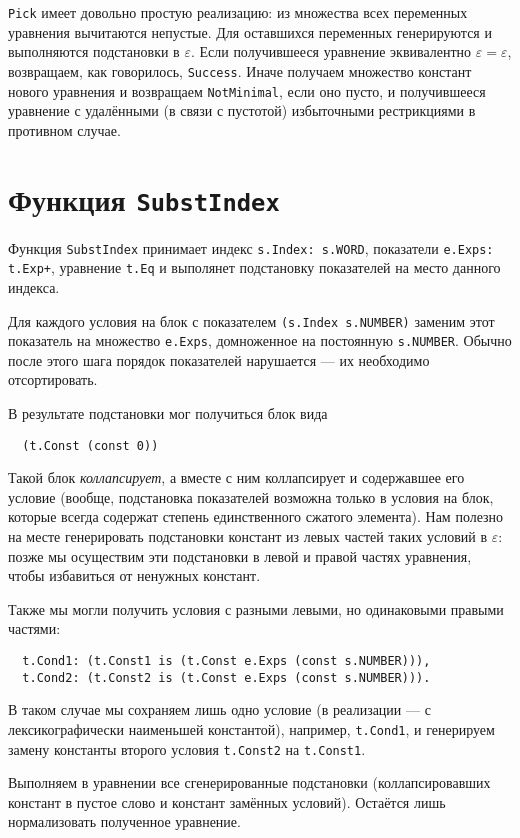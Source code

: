 \documentclass[12pt]{article}
\begin{document}
\texttt{Pick} имеет довольно простую реализацию: из множества всех переменных
уравнения вычитаются непустые. Для оставшихся переменных генерируются
и выполняются подстановки в $\varepsilon$. Если получившееся уравнение
эквивалентно $\varepsilon = \varepsilon$, возвращаем, как говорилось,
\texttt{Success}. Иначе получаем множество констант нового уравнения и
возвращаем \texttt{NotMinimal}, если оно пусто, и получившееся уравнение с
удалёнными (в связи с пустотой) избыточными рестрикциями в противном случае.

\section{Функция \texttt{SubstIndex}}

Функция \texttt{SubstIndex} принимает индекс \texttt{s.Index: s.WORD},
показатели \texttt{e.Exps: t.Exp+}, уравнение \texttt{t.Eq} и выполянет
подстановку показателей на место данного индекса.

Для каждого условия на блок с показателем \texttt{(s.Index s.NUMBER)} заменим 
этот показатель на множество \texttt{e.Exps}, домноженное на постоянную
\texttt{s.NUMBER}. Обычно после этого шага порядок показателей нарушается ---
их необходимо отсортировать.

В результате подстановки мог получиться блок вида
\begin{Verbatim}
  (t.Const (const 0))
\end{Verbatim}
Такой блок \textit{коллапсирует}, а вместе с ним коллапсирует и содержавшее
его условие (вообще, подстановка показателей возможна только в условия на блок,
которые всегда содержат степень единственного сжатого элемента). Нам полезно
на месте генерировать подстановки констант из левых частей таких условий в
$\varepsilon$: позже мы осуществим эти подстановки в левой и правой частях
уравнения, чтобы избавиться от ненужных констант.

Также мы могли получить условия с разными левыми, но одинаковыми правыми
частями:
\begin{Verbatim}
  t.Cond1: (t.Const1 is (t.Const e.Exps (const s.NUMBER))),
  t.Cond2: (t.Const2 is (t.Const e.Exps (const s.NUMBER))).
\end{Verbatim}
В таком случае мы сохраняем лишь одно условие (в реализации --- с
лексикографически наименьшей константой), например, \texttt{t.Cond1}, и
генерируем замену константы второго условия \texttt{t.Const2} на
\texttt{t.Const1}.

Выполняем в уравнении все сгенерированные подстановки (коллапсировавших
констант в пустое слово и констант замённых условий). Остаётся лишь
нормализовать полученное уравнение.
\end{document}
